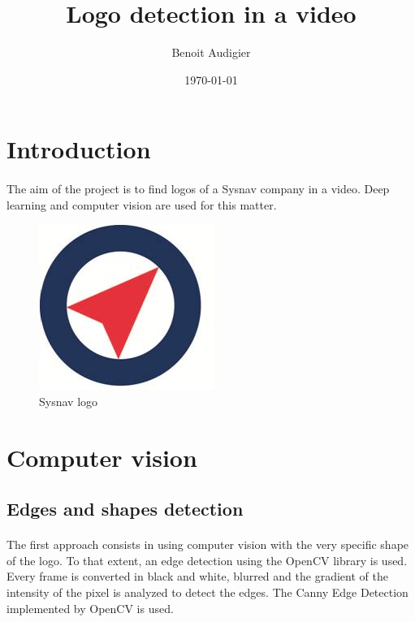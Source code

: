 \documentclass[12pt]{article}%
\begin{document}
\title{Logo detection in a video}
\author{Benoit Audigier}
\date{\today}



\maketitle
\section{Introduction}

\paragraph{}
The aim of the project is to find logos of a Sysnav company in a video. Deep learning and computer vision are used for this matter.

\begin{figure}[H]
\centering
\includegraphics[width=.2\textwidth]{images/logo.png}
\caption{\label{fig:logo}Sysnav logo}
\end{figure}




\section{Computer vision}

\subsection{Edges and shapes detection}

\paragraph{}
The first approach consists in using computer vision with the very specific shape of the logo. To that extent, an edge detection using the OpenCV library is used. Every frame is converted in black and white, blurred and the gradient of the intensity of the pixel is analyzed to detect the edges. The Canny Edge Detection \cite{canny} implemented by OpenCV is used. 
\end{document}
